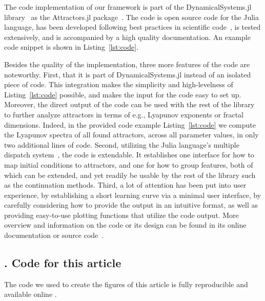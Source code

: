 \documentclass[9pt,twocolumn,twoside,lineno]{pnas-new}
\begin{document}
{The code implementation of our framework is part of the DynamicalSystems.jl library~\cite{DynamicalSystems.jl} as the Attractors.jl package~\cite{Attractors.jl}. The code is open source code for the Julia language, has been developed following best practices in scientific code~\cite{goodscientificcode}, is tested extensively, and is accompanied by a high quality documentation. An example code snippet is shown in Listing~\ref{lst:code}.

Besides the quality of the implementation, three more features of the code are noteworthy. First, that it is part of DynamicalSystems.jl instead of an isolated piece of code. This integration makes the simplicity and high-levelness of Listing~\ref{lst:code} possible, and makes the input for the code easy to set up. Moreover, the direct output of the code can be used with the rest of the library to further analyze attractors in terms of e.g., Lyapunov exponents or fractal dimensions. Indeed, in the provided code example Listing~\ref{lst:code} we compute the Lyapunov spectra of all found attractors, across all parameter values, in only two additional lines of code. Second, utilizing the Julia language's multiple dispatch system~\cite{bezanson2017julia}, the code is extendable. It establishes one interface for how to map initial conditions to attractors, and one for how to group features, both of which can be extended, and yet readily be usable by the rest of the library such as the continuation methods. Third, a lot of attention has been put into user experience, by establishing a short learning curve via a minimal user interface, by carefully considering how to provide the output in an intuitive format, as well as providing easy-to-use plotting functions that utilize the code output. More overview and information on the code or its design can be found in its online documentation or source code~\cite{Attractors.jl}.

\subsection*{. Code for this article}
The code we used to create the figures of this article is fully reproducible and available online \cite{codebase}.


} %


\showmatmethods{} %
\end{document}
